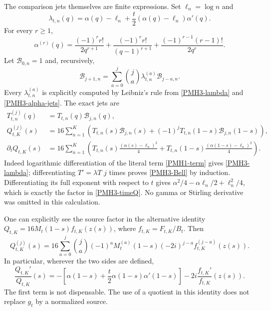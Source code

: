 \documentclass[11pt]{article}
\begin{document}
The comparison jets themselves are finite expressions. Set
$\ell_n=\log n$ and
\begin{equation}\label{PMH3-lambda}
 \lambda_{t,n}(q)=\alpha(q)-\ell_n
       +\frac t2(\alpha(q)-\ell_n)\alpha'(q).
\end{equation}
For every $r\ge1$,
\begin{equation}\label{PMH3-alpha-jets}
 \alpha^{(r)}(q)=\frac{(-1)^r r!}{2q^{r+1}}
 +\frac{(-1)^r r!}{(q-1)^{r+1}}
 +\frac{(-1)^{r-1}(r-1)!}{2q^r}.
\end{equation}
Let $\mathcal B_{0,n}=1$ and, recursively,
\begin{equation}\label{PMH3-Bell}
 \mathcal B_{j+1,n}
 =\sum_{a=0}^j\binom ja\lambda_{t,n}^{(a)}\mathcal B_{j-a,n}.
\end{equation}
Every $\lambda_{t,n}^{(a)}$ is explicitly computed by Leibniz's rule
from \eqref{PMH3-lambda} and \eqref{PMH3-alpha-jets}. The exact jets are
\begin{align}
 T_{t,n}^{(j)}(q)&=T_{t,n}(q)\mathcal B_{j,n}(q),
 \label{PMH3-term-jets}\\
 Q_{t,K}^{(j)}(s)&=16\sum_{n=1}^K
 \left(T_{t,n}(s)\mathcal B_{j,n}(s)
 +(-1)^jT_{t,n}(1-s)\mathcal B_{j,n}(1-s)\right),
 \label{PMH3-Qjets}\\
 \partial_tQ_{t,K}(s)&=16\sum_{n=1}^K
 \left(T_{t,n}(s)\frac{(\alpha(s)-\ell_n)^2}{4}
 +T_{t,n}(1-s)\frac{(\alpha(1-s)-\ell_n)^2}{4}\right).
 \label{PMH3-timeQ}
\end{align}
Indeed logarithmic differentiation of the literal term
\eqref{PMH1-term} gives \eqref{PMH3-lambda}; differentiating
$T'=\lambda T$ $j$ times proves \eqref{PMH3-Bell} by induction.
Differentiating its full exponent with respect to $t$ gives
$\alpha^2/4-\alpha\ell_n/2+\ell_n^2/4$, which is exactly the
factor in \eqref{PMH3-timeQ}. No gamma or Stirling derivative was
omitted in this calculation.

One can explicitly see the source factor in the alternative
identity $Q_{t,K}=16M_t(1-s)f_{t,K}(z(s))$, where
$f_{t,K}=F_{t,K}/B_t$. Then
\begin{equation}\label{PMH3-Bjet}
 Q_{t,K}^{(j)}(s)=16\sum_{a=0}^j\binom ja(-1)^a
 M_t^{(a)}(1-s)(-2i)^{j-a}f_{t,K}^{(j-a)}(z(s)).
\end{equation}
In particular, wherever the two sides are defined,
\begin{equation}\label{PMH3-logB}
 \frac{Q_{t,K}'}{Q_{t,K}}(s)
 =-\left[\alpha(1-s)+\frac t2\alpha(1-s)\alpha'(1-s)\right]
       -2i\frac{f_{t,K}'}{f_{t,K}}(z(s)).
\end{equation}
The first term is not dispensable. The use of a quotient in this
identity does not replace $g_t$ by a normalized source.
\end{document}
